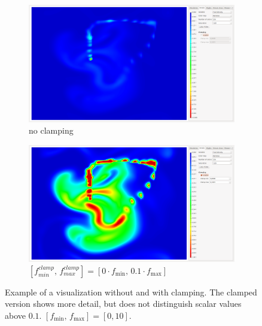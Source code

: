 \begin{figure}[tb]
	\centering
	\begin{subfigure}[t]{0.4\textwidth}
		\centering
		\includegraphics[width=\textwidth, trim={35px 30px 430px 30px}, clip]{colormapping/img/notclamped}
		\caption{no clamping}
		\label{fig:colormapping:clamped:disabled}
	\end{subfigure}
	\hspace{50px}
	\begin{subfigure}[t]{0.4\textwidth}
		\centering
		\includegraphics[width=\textwidth, trim={35px 30px 430px 30px}, clip]{colormapping/img/clamped_01}
		\caption{$[f^{clamp}_{min},\, f^{clamp}_{max}] = [0 \cdot f_{\text{min}},\, 0.1 \cdot f_{\text{max}}]$}
		\label{fig:colormapping:clamped:enabled}
	\end{subfigure}	
	\caption{Example of a visualization  without and  with clamping. The clamped version shows more detail, but does not distinguish scalar values above $0.1$. $[f_{\text{min}},\, f_{\text{max}}] = [0, 10]$.}
	\label{fig:colormapping:clamped}
\end{figure}